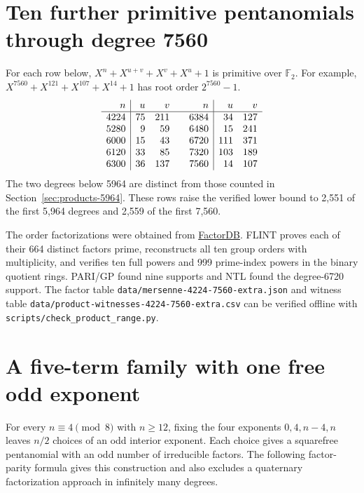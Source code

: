 \documentclass[11pt]{article}
\newcommand{\F}{\mathbb F_2}
\begin{document}
\section{Ten further primitive pentanomials through degree 7560}
\label{sec:products-7560}
For each row below, \(X^n+X^{u+v}+X^v+X^u+1\) is primitive over
\(\F\). For example, \(X^{7560}+X^{121}+X^{107}+X^{14}+1\) has root
order \(2^{7560}-1\).
\[
\begin{array}{r|rr@{\qquad}r|rr}
 n&u&v&n&u&v\\\hline
 4224&75&211&6384&34&127\\
 5280&9&59&6480&15&241\\
 6000&15&43&6720&111&371\\
 6120&33&85&7320&103&189\\
 6300&36&137&7560&14&107
\end{array}
\]
The two degrees below 5964 are distinct from those counted in
Section~\ref{sec:products-5964}. These rows raise the verified lower
bound to 2,551 of the first 5,964 degrees and 2,559 of the first 7,560.

The order factorizations were obtained from \href{https://factordb.com/}{FactorDB}.
FLINT proves each of their 664 distinct factors prime, reconstructs
all ten group orders with multiplicity, and verifies ten full powers
and 999 prime-index powers in the binary quotient rings. PARI/GP
found nine supports and NTL found the degree-6720 support. The
factor table \nolinkurl{data/mersenne-4224-7560-extra.json} and witness
table \nolinkurl{data/product-witnesses-4224-7560-extra.csv} can be
verified offline with \nolinkurl{scripts/check_product_range.py}.

\section{A five-term family with one free odd exponent}
\label{sec:progression-factor-parity}
For every \(n\equiv4\pmod8\) with \(n\ge12\), fixing the four exponents
\(0,4,n-4,n\) leaves \(n/2\) choices of an odd interior exponent.
Each choice gives a squarefree pentanomial with an odd number
of irreducible factors. The following factor-parity formula gives this
construction and also excludes a quaternary factorization approach in
infinitely many degrees.
\end{document}
